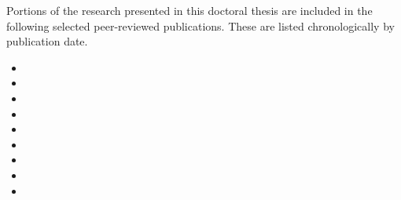 
\begin{preamble}

Portions of the research presented in this doctoral thesis are included in the following selected peer-reviewed publications. These are listed chronologically by publication date.


\begin{itemize}
    \item{}
    \item{}
    \item{}
    \item{}
    \item{}
    \item{}
    \item{}
    \item{}
    \item{}
\end{itemize}

%

\end{preamble}

\newpage
\thispagestyle{empty}
\mbox{}
\newpage
\thispagestyle{empty}
\mbox{}
\newpage